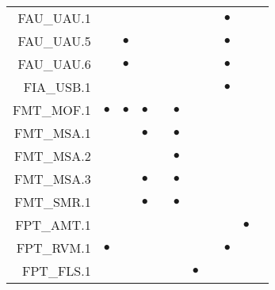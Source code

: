 \documentclass[12pt,english]{scrbook}
\newcommand{\oh}{$\bullet$}
\begin{document}
\begin{table}
\begin{tabular}{rRRRRRRRRRR}
FAU\_UAU.1          &            &                &               &          &               &                        &      & \oh                &                 &                    \\   
FAU\_UAU.5          &            &  \oh           &               &          &               &                        &      & \oh                &                 &                    \\   
FAU\_UAU.6          &            &  \oh           &               &          &               &                        &      & \oh                &                 &                    \\   
FIA\_USB.1          &            &                &               &          &               &                        &      &  \oh               &                 &                    \\   
FMT\_MOF.1          & \oh        &  \oh           &  \oh          &          & \oh           &                        &      &                    &                 &                    \\   
FMT\_MSA.1          &            &                &  \oh          &          & \oh           &                        &      &                    &                 &                    \\   
FMT\_MSA.2          &            &                &               &          & \oh           &                        &      &                    &                 &                    \\   
FMT\_MSA.3          &            &                &  \oh          &          & \oh           &                        &      &                    &                 &                    \\   
FMT\_SMR.1          &            &                &  \oh          &          & \oh           &                        &      &                    &                 &                    \\   
FPT\_AMT.1          &            &                &               &          &               &                        &      &                    &    \oh          &                    \\   
FPT\_RVM.1          & \oh        &                &               &          &               &                        &      &  \oh               &                 &                    \\   
FPT\_FLS.1          &            &                &               &          &               &     \oh                &      &                    &                 &                    \\   

\end{tabular}
\end{table}
\end{document}
